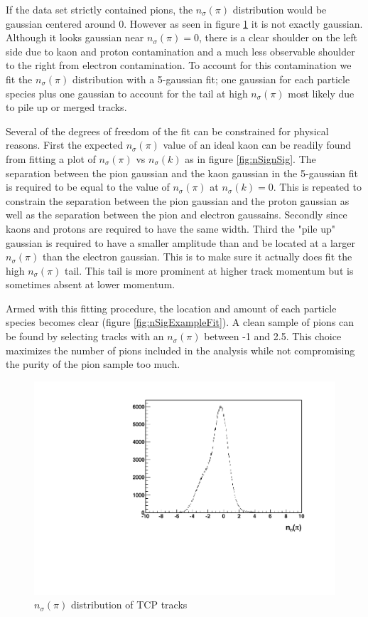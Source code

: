 \documentclass[abstract = on,listof=totoc, bibliography=totoc]{scrreprt}
\begin{document}
If the data set strictly contained pions, the $n_\sigma(\pi)$ distribution would be gaussian centered around 0. However as seen in figure \ref{fig:nSigExample} it is not exactly gaussian. Although it looks gaussian near $n_\sigma(\pi) = 0$, there is a clear shoulder on the left side due to kaon and proton contamination and a much less observable shoulder to the right from electron contamination. To account for this contamination we fit the $n_\sigma(\pi)$ distribution with a 5-gaussian fit; one gaussian for each particle species plus one gaussian to account for the tail at high $n_\sigma(\pi)$ most likely due to pile up or merged tracks. 

Several of the degrees of freedom of the fit can be constrained for physical reasons. First the expected $n_\sigma(\pi)$ value of an ideal kaon can be readily found from fitting a plot of $n_\sigma(\pi)$ vs $n_\sigma(k)$ as in figure \ref{fig:nSignSig}. The separation between the pion gaussian and the kaon gaussian in the 5-gaussian fit is required to be equal to the value of $n_\sigma(\pi)$ at $n_\sigma(k) = 0$. This is repeated to constrain the separation between the pion gaussian and the proton gaussian as well as the separation between the pion and electron gaussains. Secondly since kaons and protons are required to have the same width. Third the "pile up" gaussian is required to have a smaller amplitude than and be located at a larger $n_\sigma(\pi)$ than the electron gaussian. This is to make sure it actually does fit the high $n_\sigma(\pi)$ tail. This tail is more prominent at higher track momentum but is sometimes absent at lower momentum.  

Armed with this fitting procedure, the location and amount of each particle species becomes clear (figure \ref{fig:nSigExampleFit}). A clean sample of pions can be found by selecting tracks with an $n_\sigma(\pi)$ between -1 and 2.5. This choice maximizes the number of pions included in the analysis while not compromising the purity of the pion sample too much.  


         
 \begin{figure}
\begin{center}
\includegraphics[width = .7\textwidth]{histogramExample.pdf}
\caption[$n_\sigma(\pi)$ distribution]{$n_\sigma(\pi)$ distribution of TCP tracks}
\label{fig:nSigExample}
\end{center}
\end{figure}
\end{document}
